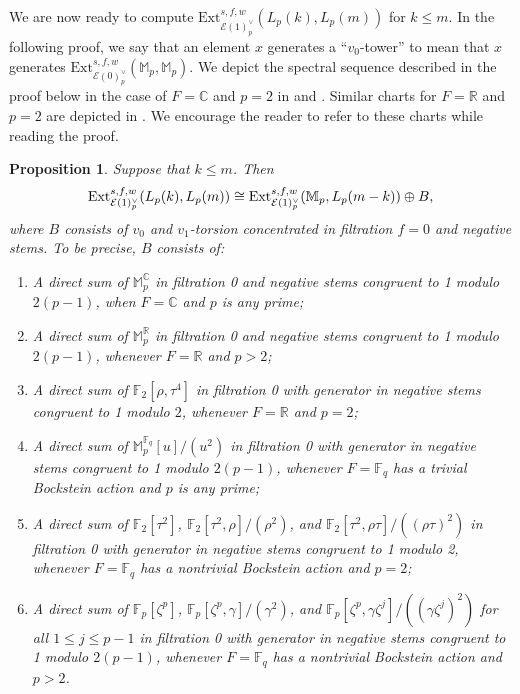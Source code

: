 \documentclass{amsart}
\newtheorem{proposition}[theorem]{Proposition}
\theoremstyle{plain}
\numberwithin{theorem}{section}
\numberwithin{equation}{section}
\numberwithin{figure}{section}
\newcommand{\0}{\langle 0 \rangle }
\begin{document}
We are now ready to compute $\text{Ext}_{\mathcal{E}(1)^\vee_p}^{s,f,w}(L_p(k), L_p(m))$ for $k \leq m$. In the following proof, we say that an element $x$ generates a ``$v_0$-tower'' to mean that $x$ generates $\text{Ext}_{\mathcal{E}(0)^\vee_p}^{s,f,w}(\mathbb{M}_p, \mathbb{M}_p)$. We depict the spectral sequence described in the proof below in the case of $F=\mathbb{C}$ and $p=2$ in  and . Similar charts for $F=\mathbb{R}$ and $p=2$ are depicted in \cite[Section 6]{LiPetTat25}. We encourage the reader to refer to these charts while reading the proof.
\begin{proposition}
\label{prop:ExtLightningflashKleqM}
    Suppose that $k \leq m$. Then 
    \[\textup{Ext}^{s,f,w}_{\mathcal{E}(1)^\vee_p}(L_p(k), L_p(m)) \cong \textup{Ext}_{\mathcal{E}(1)^\vee_p}^{s,f,w}(\mathbb{M}_p, L_p(m-k)) \oplus B,\]
    where $B$ consists of $v_0$ and $v_1$-torsion concentrated in filtration $f=0$ and negative stems.
    To be precise, $B$ consists of:
    \begin{enumerate}
        \item A direct sum of $\mathbb{M}_p^{\mathbb{C}}$ in filtration 0 and negative stems congruent to 1 modulo $2(p-1)$, when $F=\mathbb{C}$ and $p$ is any prime;
        \item A direct sum of $\mathbb{M}_p^\mathbb{R}$ in filtration 0 and negative stems congruent to 1 modulo $2(p-1)$, whenever $F=\mathbb{R}$ and $p>2$;
        \item A direct sum of $\mathbb{F}_2[\rho, \tau^4]$ in filtration 0 with generator in negative stems congruent to 1 modulo $2$, whenever $F=\mathbb{R}$ and $p=2$;
        \item A direct sum of $\mathbb{M}_p^{\mathbb{F}_q}[u]/(u^2)$ in filtration 0 with generator in negative stems congruent to 1 modulo $2(p-1)$, whenever $F=\mathbb{F}_q$ has a trivial Bockstein action and $p$ is any prime;
        \item A direct sum of $\mathbb{F}_2[\tau^2]$,  $\mathbb{F}_2[\tau^2, \rho]/(\rho^2)$, and $\mathbb{F}_2[\tau^2, \rho\tau]/((\rho\tau)^2)$ in filtration 0 with generator in negative stems congruent to 1 modulo 2, whenever $F=\mathbb{F}_q$ has a nontrivial Bockstein action and $p=2$;
        \item A direct sum of $\mathbb{F}_p[\zeta^p]$, $\mathbb{F}_p[\zeta^p, \gamma]/(\gamma^2)$, and $\mathbb{F}_p[\zeta^p, \gamma\zeta^j]/((\gamma\zeta^j)^2)$ for all $1 \leq j \leq p-1$ in filtration 0 with generator in negative stems congruent to 1 modulo $2(p-1)$, whenever $F=\mathbb{F}_q$ has a nontrivial Bockstein action and $p>2$.
    \end{enumerate}
\end{proposition}
\end{document}
